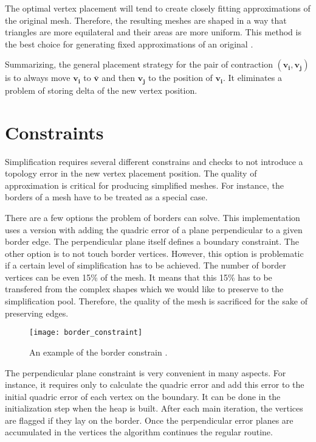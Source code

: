 The optimal vertex placement will tend to create closely fitting approximations of the original mesh. Therefore, the resulting meshes are shaped in a way that triangles are more equilateral and their areas are more uniform. This method is the best choice for generating fixed approximations of an original \cite{garland99}. 

Summarizing, the general placement strategy for the pair of contraction $(\mathbf{v_i}, \mathbf{v_j})$ is to always move $\mathbf{v_i}$ to $\mathbf{\bar{v}}$ and then $\mathbf{v_j}$ to the position of $\mathbf{v_i}$. It eliminates a problem of storing delta of the new vertex position.

\newpage
\section{Constraints}

Simplification requires several different constrains and checks to not introduce a topology error in the new vertex placement position. The quality of approximation is critical for producing simplified meshes. For instance, the borders of a mesh have to be treated as a special case.

There are a few options the problem of borders can solve. This implementation uses a version with adding the quadric error of a plane perpendicular to a given border edge. The perpendicular plane itself defines a boundary constraint. The other option is to not touch border vertices. However, this option is problematic if a certain level of simplification has to be achieved. The number of border vertices can be even 15\% of the mesh. It means that this 15\% has to be transfered from the complex shapes which we would like to preserve to the simplification pool. Therefore, the quality of the mesh is sacrificed  for the sake of preserving edges.

\begin{figure}[h!]
  \begin{center}
    \texttt{[image: border\_constraint]}
    \caption{An example of the border constrain \cite{garland99}.}
    \label{fig:border_constraint}
  \end{center}
\end{figure}

The perpendicular plane constraint is very convenient in many aspects. For instance, it requires only to calculate the quadric error and add this error to the initial quadric error of each vertex on the boundary. It can be done in the initialization step when the heap is built. After each main iteration, the vertices are flagged if they lay on the border. Once the perpendicular error planes are accumulated in the vertices the algorithm continues the regular routine.

